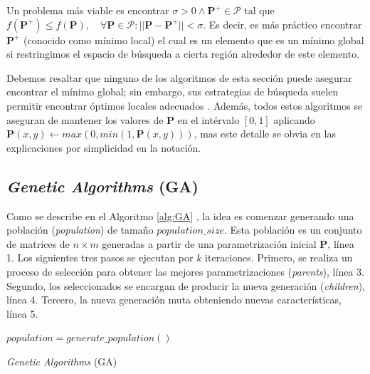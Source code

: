 Un problema más viable es encontrar $\sigma > 0 \land \boldsymbol{P^{+}} \in \pmb{\mathscr{P}}$ 
tal que 
$f(\boldsymbol{P^{+}}) \leq f(\boldsymbol{P}), \quad \forall \boldsymbol{P} \in \pmb{\mathscr{P}}:
|| \boldsymbol{P} - \boldsymbol{P^{+}}|| < \sigma$.
Es decir, es más práctico encontrar $\boldsymbol{P^{+}}$ (conocido como mínimo local)
el cual es un elemento que es un mínimo global si restringimos el espacio de búsqueda a cierta región
alrededor de este elemento.

Debemos resaltar que ninguno de los algoritmos de esta sección puede asegurar encontrar el mínimo global;
sin embargo, sus estrategias de búsqueda suelen permitir encontrar 
óptimos locales adecuados \citep{Angeris2021, Schneider2019}.
Además, todos estos algoritmos se aseguran de mantener los valores de $\boldsymbol{P}$ en el
intérvalo $[0, 1]$ aplicando $\boldsymbol{P}(x, y) \gets max(0, min(1, \boldsymbol{P}(x, y)))$, mas
este detalle se obvia en las explicaciones por simplicidad en la notación.

\subsection{\emph{Genetic Algorithms} (GA)}\label{sec:ga}

Como se describe en el Algoritmo \ref{alg:GA} \citep{Mykel2019}, la idea es 
comenzar generando una población (\emph{population}) de tamaño $population\_size$.
Esta población es un conjunto de matrices de $n \times m$ generadas a partir de una parametrización
inicial $\boldsymbol{P}$, línea 1.
Los siguientes tres pasos se ejecutan por $k$ iteraciones.
Primero, se realiza un proceso de selección para obtener las mejores parametrizaciones
(\emph{parents}), línea 3.
Segundo, los seleccionados se encargan de producir la nueva generación
(\emph{children}), línea 4.
Tercero, la nueva generación muta obteniendo nuevas características, línea 5.

\begin{algorithm}
{}
$population = generate\_population()$ \\
\caption{\emph{Genetic Algorithms} (GA)}
\label{alg:GA}
\end{algorithm}

